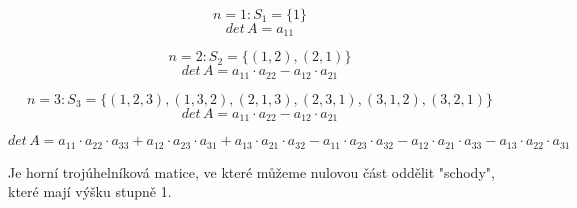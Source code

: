 \begin{example}
    $$n = 1: S_1=\{1\}$$
    $$det\,A = a_{11}$$
\end{example}

\begin{example}
    $$n = 2: S_2=\{(1,2), (2,1)\}$$
    $$det\,A = a_{11} \cdot a_{22} - a_{12} \cdot a_{21}$$
\end{example}

\begin{example}
    $$n = 3: S_3=\{(1,2,3), (1,3,2), (2,1,3), (2,3,1), (3,1,2), (3,2,1)\}$$
    $$det\,A = a_{11} \cdot a_{22} - a_{12} \cdot a_{21}$$

    $$det\,A = a_{11}\cdot a_{22}\cdot a_{33} +
               a_{12}\cdot a_{23}\cdot a_{31} +
               a_{13}\cdot a_{21}\cdot a_{32} -
               a_{11}\cdot a_{23}\cdot a_{32} -
               a_{12}\cdot a_{21}\cdot a_{33} -
               a_{13}\cdot a_{22}\cdot a_{31}
    $$
\end{example}

\begin{definition}
    Je horní trojúhelníková matice, ve které můžeme nulovou část oddělit "schody", které
    mají výšku stupně 1.
\end{definition}

